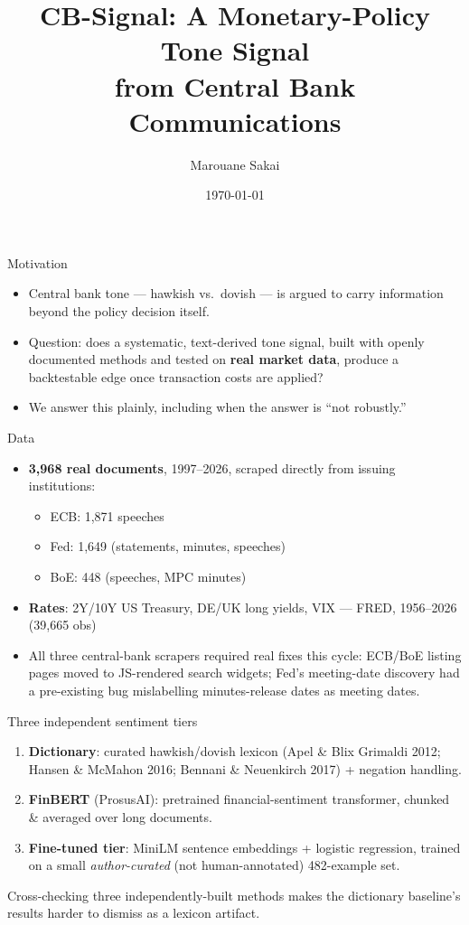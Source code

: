 \documentclass[11pt]{beamer}
\title[CB-Signal]{CB-Signal: A Monetary-Policy Tone Signal\\from Central Bank Communications}
\author{Marouane Sakai}
\date{\today}
\begin{document}
\frame{\titlepage}

\begin{frame}{Motivation}
\begin{itemize}
  \item Central bank tone --- hawkish vs.\ dovish --- is argued to carry
    information beyond the policy decision itself.
  \item Question: does a systematic, text-derived tone signal, built with
    openly documented methods and tested on \textbf{real market data},
    produce a backtestable edge once transaction costs are applied?
  \item We answer this plainly, including when the answer is ``not
    robustly.''
\end{itemize}
\end{frame}

\begin{frame}{Data}
\begin{itemize}
  \item \textbf{3,968 real documents}, 1997--2026, scraped directly from
    issuing institutions:
  \begin{itemize}
    \item ECB: 1,871 speeches
    \item Fed: 1,649 (statements, minutes, speeches)
    \item BoE: 448 (speeches, MPC minutes)
  \end{itemize}
  \item \textbf{Rates}: 2Y/10Y US Treasury, DE/UK long yields, VIX --- FRED,
    1956--2026 (39,665 obs)
  \item All three central-bank scrapers required real fixes this cycle:
    ECB/BoE listing pages moved to JS-rendered search widgets; Fed's
    meeting-date discovery had a pre-existing bug mislabelling
    minutes-release dates as meeting dates.
\end{itemize}
\end{frame}

\begin{frame}{Three independent sentiment tiers}
\begin{enumerate}
  \item \textbf{Dictionary}: curated hawkish/dovish lexicon
    (Apel \& Blix Grimaldi 2012; Hansen \& McMahon 2016; Bennani \&
    Neuenkirch 2017) + negation handling.
  \item \textbf{FinBERT} (ProsusAI): pretrained financial-sentiment
    transformer, chunked \& averaged over long documents.
  \item \textbf{Fine-tuned tier}: MiniLM sentence embeddings + logistic
    regression, trained on a small \emph{author-curated} (not
    human-annotated) 482-example set.
\end{enumerate}
\vspace{0.5em}
Cross-checking three independently-built methods makes the dictionary
baseline's results harder to dismiss as a lexicon artifact.
\end{frame}
\end{document}
